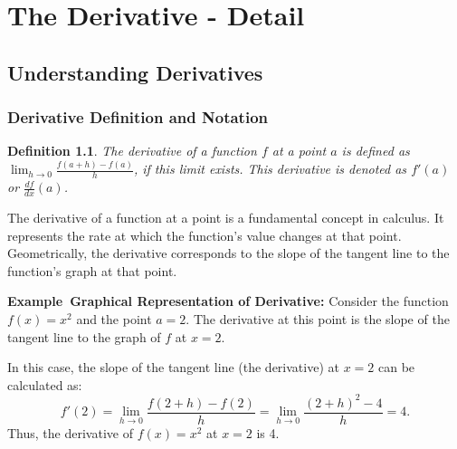 \documentclass[a4paper,12pt]{book}
\newcounter{example}
\newenvironment{example}[1][\theexample]
  {\refstepcounter{example}\par\medskip\noindent\textbf{Example~#1:} \rmfamily}
  {\medskip}
\newtheorem{definition}{Definition}
\begin{document}

\chapter{The Derivative - Detail}
\section{Understanding Derivatives}
\subsection{Derivative Definition and Notation}

\begin{definition}
The derivative of a function \( f \) at a point \( a \) is defined as \(\lim_{h \to 0} \frac{f(a+h) - f(a)}{h}\), if this limit exists. This derivative is denoted as \( f'(a) \) or \( \frac{df}{dx}(a) \).
\end{definition}

The derivative of a function at a point is a fundamental concept in calculus. It represents the rate at which the function's value changes at that point. Geometrically, the derivative corresponds to the slope of the tangent line to the function's graph at that point.

\begin{example}[Graphical Representation of Derivative]
Consider the function \( f(x) = x^2 \) and the point \( a = 2 \). The derivative at this point is the slope of the tangent line to the graph of \( f \) at \( x = 2 \).

\begin{center}
\end{center}

In this case, the slope of the tangent line (the derivative) at \( x = 2 \) can be calculated as:
\[ f'(2) = \lim_{h \to 0} \frac{f(2+h) - f(2)}{h} = \lim_{h \to 0} \frac{(2+h)^2 - 4}{h} = 4. \]
Thus, the derivative of \( f(x) = x^2 \) at \( x = 2 \) is 4.
\end{example}
\end{document}
